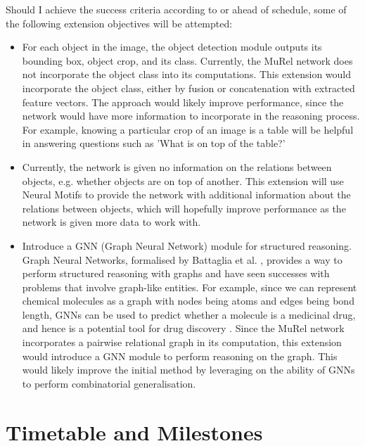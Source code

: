 \documentclass[12pt]{article}
\begin{document}
Should I achieve the success criteria according to or ahead of schedule, some of the following extension objectives will be attempted: 
\begin{itemize}
	\item For each object in the image, the object detection module outputs its bounding box, object crop, and its class. Currently, the MuRel network does not incorporate the object class into its computations. This extension would  incorporate the object class, either by fusion or concatenation with extracted feature vectors. The approach would likely improve performance, since the network would have more information to incorporate in the reasoning process. For example, knowing a particular crop of an image is a table will be helpful in answering questions such as 'What is on top of the table?'
	
	\item Currently, the network is given no information on the relations between objects, e.g. whether objects are on top of another. This extension will use Neural Motifs \cite{neuralmotifs} to provide the network with additional information about the relations between objects, which will hopefully improve performance as the network is given more data to work with.
	
	\item Introduce a GNN (Graph Neural Network) module for structured reasoning. Graph Neural Networks, formalised by Battaglia et al. \cite{graphnn}, provides a way to perform structured reasoning with graphs and have seen successes with problems that involve graph-like entities. For example, since we can represent chemical molecules as a graph with nodes being atoms and edges being bond length, GNNs can be used to predict whether a molecule is a medicinal drug, and hence is a potential tool for drug discovery \cite{drug}. Since the MuRel network incorporates a pairwise relational graph in its computation, this extension would introduce a GNN module to perform reasoning on the graph. This would likely improve the initial method by leveraging on the ability of GNNs to perform combinatorial generalisation.
\end{itemize}

\section*{Timetable and Milestones}
\end{document}
